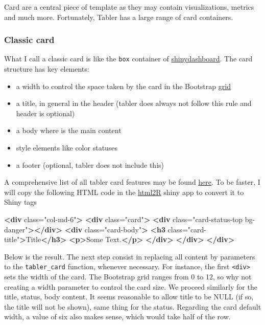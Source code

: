 \documentclass[
]{book}
\newenvironment{Shaded}{\begin{snugshade}}{\end{snugshade}}
\newcommand{\KeywordTok}[1]{\textcolor[rgb]{0.13,0.29,0.53}{\textbf{#1}}}
\newcommand{\NormalTok}[1]{#1}
\newcommand{\OtherTok}[1]{\textcolor[rgb]{0.56,0.35,0.01}{#1}}
\newcommand{\StringTok}[1]{\textcolor[rgb]{0.31,0.60,0.02}{#1}}
\providecommand{\tightlist}{%
  \setlength{\itemsep}{0pt}\setlength{\parskip}{0pt}}
\begin{document}
Card are a central piece of template as they may contain visualizations, metrics and much more. Fortunately, Tabler has a large range of card containers.

\hypertarget{classic-card}{%
\subsubsection{Classic card}\label{classic-card}}

What I call a classic card is like the \texttt{box} container of \href{https://rstudio.github.io/shinydashboard/structure.html}{shinydashboard}. The card structure has key elements:

\begin{itemize}
\tightlist
\item
  a width to control the space taken by the card in the Bootstrap \href{https://getbootstrap.com/docs/4.0/layout/grid/}{grid}
\item
  a title, in general in the header (tabler does always not follow this rule and header is optional)
\item
  a body where is the main content
\item
  style elements like color statuses
\item
  a footer (optional, tabler does not include this)
\end{itemize}

A comprehensive list of all tabler card features may be found \href{https://preview-dev.tabler.io/docs/cards.html}{here}. To be faster, I will copy the following HTML code in the \href{https://github.com/alandipert/html2r}{html2R} shiny app to convert it to Shiny tags

\begin{Shaded}
\begin{Highlighting}[]
\KeywordTok{<div}\OtherTok{ class=}\StringTok{"col-md-6"}\KeywordTok{>}
  \KeywordTok{<div}\OtherTok{ class=}\StringTok{"card"}\KeywordTok{>}
    \KeywordTok{<div}\OtherTok{ class=}\StringTok{"card-status-top bg-danger"}\KeywordTok{></div>}
    \KeywordTok{<div}\OtherTok{ class=}\StringTok{"card-body"}\KeywordTok{>}
      \KeywordTok{<h3}\OtherTok{ class=}\StringTok{"card-title"}\KeywordTok{>}\NormalTok{Title}\KeywordTok{</h3>}
      \KeywordTok{<p>}\NormalTok{Some Text.}\KeywordTok{</p>}
    \KeywordTok{</div>}
  \KeywordTok{</div>}
\KeywordTok{</div>}
\end{Highlighting}
\end{Shaded}

Below is the result. The next step consist in replacing all content by parameters to the \texttt{tabler\_card} function, whenever necessary. For instance, the first \texttt{\textless{}div\textgreater{}} sets the width of the card. The Bootstrap grid ranges from 0 to 12, so why not creating a width parameter to control the card size. We proceed similarly for the title, status, body content. It seems reasonable to allow title to be NULL (if so, the title will not be shown), same thing for the status. Regarding the card default width, a value of six also makes sense, which would take half of the row.
\end{document}
